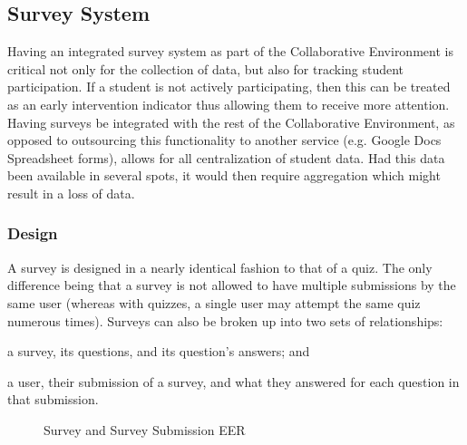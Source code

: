 \subsection{Survey System}
\label{subsec:design-survey}
Having an integrated survey system as part of the Collaborative Environment is critical not only for the collection of data, but also for tracking student participation. If a student is not actively participating, then this can be treated as an early intervention indicator thus allowing them to receive more attention. Having surveys be integrated with the rest of the Collaborative Environment, as opposed to outsourcing this functionality to another service (e.g. Google Docs Spreadsheet forms), allows for all centralization of student data. Had this data been available in several spots, it would then require aggregation which might result in a loss of data.

\subsubsection{Design}
A survey is designed in a nearly identical fashion to that of a quiz. The only difference being that a survey is not allowed to have multiple submissions by the same user (whereas with quizzes, a single user may attempt the same quiz numerous times). Surveys can also be broken up into two sets of relationships:
\begin{inparaenum}[\itshape 1\upshape)]
	\item a survey, its questions, and its question's answers; and
	\item a user, their submission of a survey, and what they answered for each question in that submission.
\end{inparaenum}

\begin{figure}[h!]
	\centering
	\caption{Survey and Survey Submission EER}
	\label{fig:er-survey}
\end{figure}

